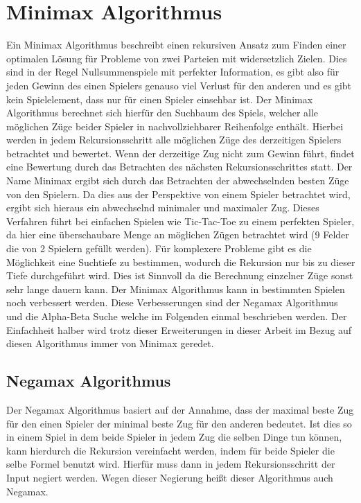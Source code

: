 \section{Minimax Algorithmus}
Ein Minimax Algorithmus beschreibt einen rekursiven Ansatz zum Finden einer optimalen Lösung für Probleme von zwei Parteien mit widersetzlich Zielen. Dies sind in der Regel Nullsummenspiele mit perfekter Information, es gibt also für jeden Gewinn des einen Spielers genauso viel Verlust für den anderen und es gibt kein Spielelement, dass nur für einen Spieler einsehbar ist. Der Minimax Algorithmus berechnet sich hierfür den Suchbaum des Spiels, welcher alle möglichen Züge beider Spieler in nachvollziehbarer Reihenfolge enthält. Hierbei werden in jedem Rekursionsschritt alle möglichen Züge des derzeitigen Spielers betrachtet und bewertet. Wenn der derzeitige Zug nicht zum Gewinn führt, findet eine Bewertung durch das Betrachten des nächsten Rekursionsschrittes statt. 
Der Name Minimax ergibt sich durch das Betrachten der abwechselnden besten Züge von den Spielern. Da dies aus der Perspektive von einem Spieler betrachtet wird, ergibt sich hieraus ein abwechselnd minimaler und maximaler Zug. Dieses Verfahren führt bei einfachen Spielen wie Tic-Tac-Toe zu einem perfekten Spieler, da hier eine überschaubare Menge an möglichen Zügen betrachtet wird (9 Felder die von 2 Spielern gefüllt werden). Für komplexere Probleme gibt es die Möglichkeit eine Suchtiefe zu bestimmen, wodurch die Rekursion  nur bis zu dieser Tiefe durchgeführt wird. Dies ist Sinnvoll da die Berechnung einzelner Züge sonst sehr lange dauern kann. Der Minimax Algorithmus kann in bestimmten Spielen noch verbessert werden. Diese Verbesserungen sind der Negamax Algorithmus und die Alpha-Beta Suche welche im Folgenden einmal beschrieben werden.  Der Einfachheit halber wird trotz dieser Erweiterungen in dieser Arbeit im Bezug auf diesen Algorithmus immer von Minimax geredet.

\subsection{Negamax Algorithmus}
Der Negamax Algorithmus basiert auf der Annahme, dass der maximal beste Zug für den einen Spieler der minimal beste Zug für den anderen bedeutet. Ist dies so in einem Spiel in dem beide Spieler in jedem Zug die selben Dinge tun können, kann hierdurch die Rekursion vereinfacht werden, indem für beide Spieler die selbe Formel benutzt wird. Hierfür muss dann in jedem Rekursionsschritt der Input negiert werden. Wegen dieser Negierung heißt dieser Algorithmus auch Negamax.

